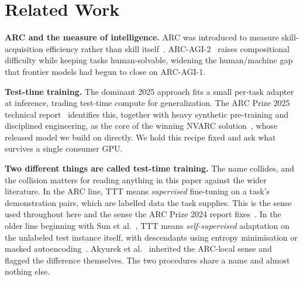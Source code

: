 \documentclass[11pt]{article}
\begin{document}
\section{Related Work}
\label{sec:related}

\textbf{ARC and the measure of intelligence.} ARC was introduced to measure skill-acquisition
efficiency rather than skill itself~\cite{chollet}. ARC-AGI-2~\cite{arcagi2} raises compositional
difficulty while keeping tasks human-solvable, widening the human/machine gap that frontier models
had begun to close on ARC-AGI-1.

\textbf{Test-time training.} The dominant 2025 approach fits a small per-task adapter at inference,
trading test-time compute for generalization. The ARC Prize 2025 technical report~\cite{arc2025}
identifies this, together with heavy synthetic pre-training and disciplined engineering, as the core
of the winning NVARC solution~\cite{nvarc}, whose released model we build on directly. We hold this
recipe fixed and ask what survives a single consumer GPU.

\textbf{Two different things are called test-time training.} The name collides, and the collision
matters for reading anything in this paper against the wider literature. In the ARC line, TTT means
\emph{supervised} fine-tuning on a task's demonstration pairs, which are labelled data the task
supplies. This is the sense used throughout here and the sense the ARC Prize 2024 report
fixes~\cite{arc2024}. In the older line beginning with Sun et al.~\cite{sun2020}, TTT means
\emph{self-supervised} adaptation on the unlabeled test instance itself, with descendants using
entropy minimisation or masked autoencoding~\cite{ttmae}. Akyurek et al.~\cite{akyurek2024}
inherited the ARC-local sense and flagged the difference themselves. The two procedures share a name
and almost nothing else.
\end{document}
